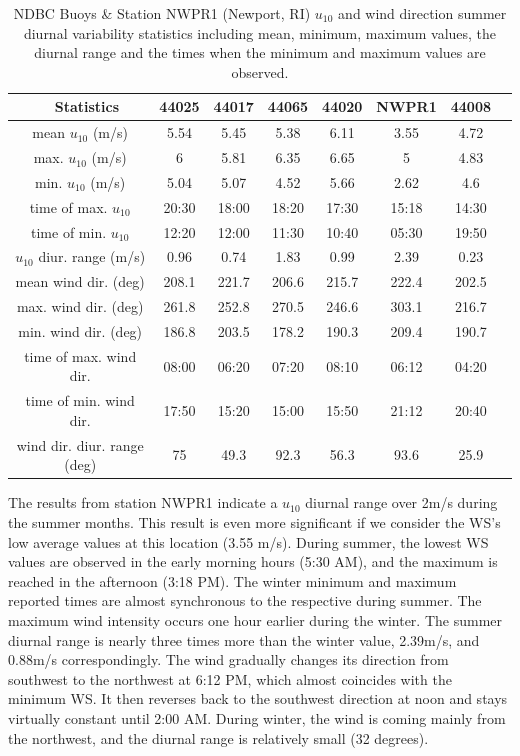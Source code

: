 \begin{table}[H]
\begin{tabular*}{\textwidth}{c @{\extracolsep{\fill}} ccccccc}
\toprule
    ~       Statistics       & 44025 & 44017 & 44065 & 44020 & NWPR1 & 44008 \\ \midrule
    mean $u_{10}$  (m/s)       & 5.54  & 5.45  & 5.38  & 6.11  & 3.55  & 4.72  \\
    max. $u_{10}$ (m/s)        & 6     & 5.81  & 6.35  & 6.65  & 5  & 4.83  \\
    min. $u_{10}$ (m/s)         & 5.04  & 5.07  & 4.52  & 5.66  & 2.62  & 4.6   \\
    time of max. $u_{10}$      & 20:30 & 18:00 & 18:20 & 17:30 & 15:18 & 14:30 \\
    time of min. $u_{10}$      & 12:20 & 12:00 & 11:30 & 10:40 & 05:30 & 19:50 \\
    $u_{10}$ diur. range (m/s) & 0.96  & 0.74  & 1.83  & 0.99  & 2.39  & 0.23  \\ \midrule
    mean wind dir. (deg)            & 208.1 & 221.7 & 206.6 & 215.7 & 222.4 & 202.5 \\
    max. wind dir. (deg)            & 261.8 & 252.8 & 270.5 & 246.6 & 303.1 & 216.7 \\
    min. wind dir. (deg)            & 186.8 & 203.5 & 178.2 & 190.3 & 209.4 & 190.7 \\
    time of max. wind dir.           & 08:00 & 06:20 & 07:20 & 08:10 & 06:12 & 04:20 \\
    time of min. wind dir.           & 17:50 & 15:20 & 15:00 & 15:50 & 21:12 & 20:40 \\
    wind dir. diur. range (deg)     & 75    & 49.3  & 92.3  & 56.3  & 93.6  & 25.9  \\ \bottomrule
\end{tabular*}
\caption {NDBC Buoys \& Station NWPR1 (Newport, RI) $u_{10}$ and wind direction summer diurnal variability statistics including mean, minimum, maximum values, the diurnal range and the times when the minimum and maximum values are observed.}
\label{tab:diurnal_summer}
\end{table}



The results from station NWPR1 indicate a $u_{10}$ diurnal range over 2m/s during the summer months. This result is even more significant if we consider the WS's low average values at this location (3.55 m/s). During summer, the lowest WS values are observed in the early morning hours (5:30 AM), and the maximum is reached in the afternoon (3:18 PM). The winter minimum and maximum reported times are almost synchronous to the respective during summer. The maximum wind intensity occurs one hour earlier during the winter. The summer diurnal range is nearly three times more than the winter value, 2.39m/s, and 0.88m/s correspondingly. The wind gradually changes its direction from southwest to the northwest at 6:12 PM, which almost coincides with the minimum WS. It then reverses back to the southwest direction at noon and stays virtually constant until 2:00 AM. During winter, the wind is coming mainly from the northwest, and the diurnal range is relatively small (32 degrees). 



